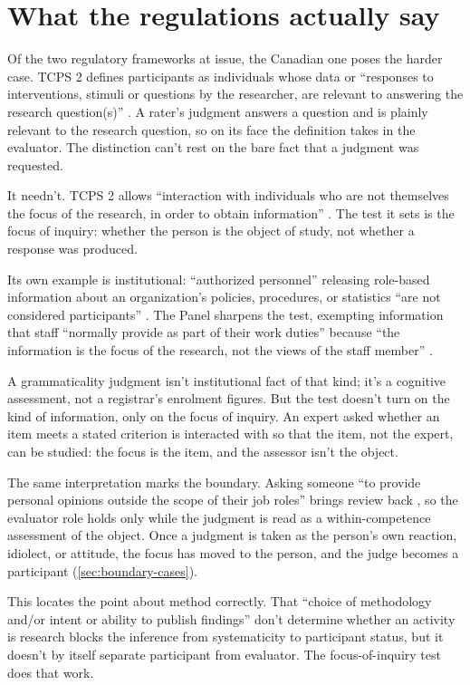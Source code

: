 \section{What the regulations actually say}
\label{sec:regulatory-asymmetry}

Of the two regulatory frameworks at issue, the Canadian one poses the harder case. TCPS 2 defines participants as individuals whose data or \enquote{responses to interventions, stimuli or questions by the researcher, are relevant to answering the research question(s)} \citep{tcps2_2022}. A rater's judgment answers a question and is plainly relevant to the research question, so on its face the definition takes in the evaluator. The distinction can't rest on the bare fact that a judgment was requested.

It needn't. TCPS 2 allows \enquote{interaction with individuals who are not themselves the focus of the research, in order to obtain information} \citep{tcps2_2022}. The test it sets is the focus of inquiry: whether the person is the object of study, not whether a response was produced.

Its own example is institutional: \enquote{authorized personnel} releasing role-based information about an organization's policies, procedures, or statistics \enquote{are not considered participants} \citep{tcps2_2022}. The Panel sharpens the test, exempting information that staff \enquote{normally provide as part of their work duties} because \enquote{the information is the focus of the research, not the views of the staff member} \citep{pre_scope}.

A grammaticality judgment isn't institutional fact of that kind; it's a cognitive assessment, not a registrar's enrolment figures. But the test doesn't turn on the kind of information, only on the focus of inquiry. An expert asked whether an item meets a stated criterion is interacted with so that the item, not the expert, can be studied: the focus is the item, and the assessor isn't the object.

The same interpretation marks the boundary. Asking someone \enquote{to provide personal opinions outside the scope of their job roles} brings review back \citep{pre_scope}, so the evaluator role holds only while the judgment is read as a within-competence assessment of the object. Once a judgment is taken as the person's own reaction, idiolect, or attitude, the focus has moved to the person, and the judge becomes a participant (\autoref{sec:boundary-cases}).

This locates the point about method correctly. That \enquote{choice of methodology and/or intent or ability to publish findings} don't determine whether an activity is research \citep{tcps2_2022} blocks the inference from systematicity to participant status, but it doesn't by itself separate participant from evaluator. The focus-of-inquiry test does that work.

